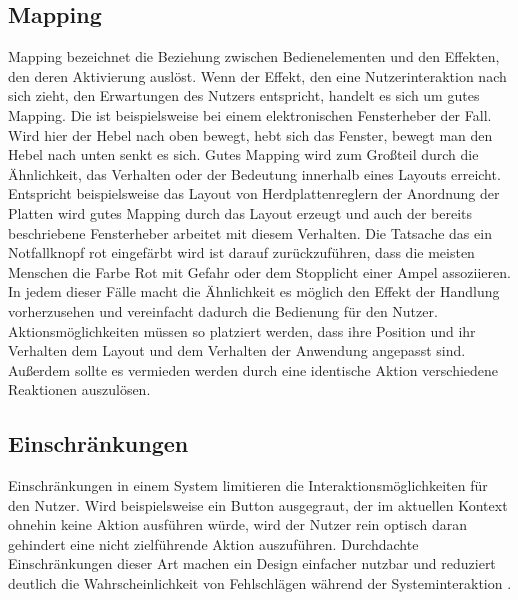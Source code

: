 \subsection*{Mapping}
Mapping bezeichnet die Beziehung zwischen Bedienelementen und den Effekten, den deren Aktivierung auslöst.
Wenn der Effekt, den eine Nutzerinteraktion nach sich zieht, den Erwartungen des Nutzers entspricht, handelt es sich um gutes Mapping.
Die ist beispielsweise bei einem elektronischen Fensterheber der Fall. Wird hier der Hebel nach oben bewegt, hebt sich das Fenster, bewegt man den Hebel nach unten senkt es sich.
Gutes Mapping wird zum Großteil durch die Ähnlichkeit, das Verhalten oder der Bedeutung innerhalb eines Layouts erreicht.
Entspricht beispielsweise das Layout von Herdplattenreglern der Anordnung der Platten wird gutes Mapping durch das Layout erzeugt und auch der bereits beschriebene Fensterheber arbeitet mit diesem Verhalten.
Die Tatsache das ein Notfallknopf rot eingefärbt wird ist darauf zurückzuführen, dass die meisten Menschen die Farbe Rot mit Gefahr oder dem Stopplicht einer Ampel assoziieren.
In jedem dieser Fälle macht die Ähnlichkeit es möglich den Effekt der Handlung vorherzusehen und vereinfacht dadurch die Bedienung für den Nutzer.
Aktionsmöglichkeiten müssen so platziert werden, dass ihre Position und ihr Verhalten dem Layout und dem Verhalten der Anwendung angepasst sind. 
Außerdem sollte es vermieden werden durch eine identische Aktion verschiedene Reaktionen auszulösen\cite{Lidwell.2010}.

\subsection*{Einschränkungen}
Einschränkungen in einem System limitieren die Interaktionsmöglichkeiten für den Nutzer.
Wird beispielsweise ein Button ausgegraut, der im aktuellen Kontext ohnehin keine Aktion ausführen würde, wird der Nutzer rein optisch daran gehindert eine nicht zielführende Aktion auszuführen.
Durchdachte Einschränkungen dieser Art machen ein Design einfacher nutzbar und reduziert deutlich die Wahrscheinlichkeit von Fehlschlägen während der Systeminteraktion \cite{Lidwell.2010}.

